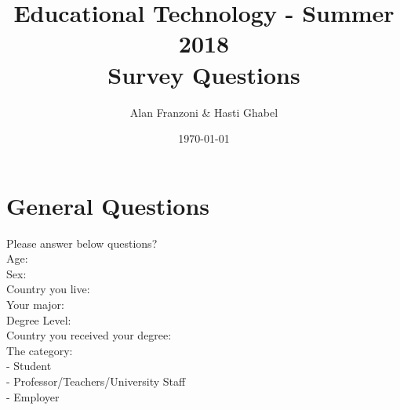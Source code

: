 \documentclass[12pt,a4paper,titlepage]{article}
\title{\blue Educational Technology - Summer 2018 \\
\blueb Survey Questions}
\author{Alan Franzoni \& Hasti Ghabel}
\date{\today}
\begin{document}
\maketitle

\section {General Questions}

Please  answer below questions?\\
Age:\\
Sex:\\
Country you live:\\
Your major:\\
Degree Level:\\
Country you received your degree:\\
The category:\\
	-  Student\\
	-  Professor/Teachers/University Staff\\
	-  Employer\\
\end{document}
